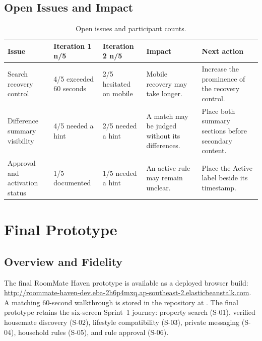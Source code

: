 \documentclass[11pt,a4paper]{article}
\begin{document}
\subsection{Open Issues and Impact}
\label{subsecpersistentissues}

\begin{table}[H]
    \centering
    \footnotesize
    \caption{Open issues and participant counts.}
    \begin{tabularx}{\textwidth}{@{}L{3.0cm}L{1.8cm}L{1.8cm}YL{3.1cm}@{}}
        \toprule
        Issue & Iteration 1 n/5 & Iteration 2 n/5 & Impact & Next action\\
        \midrule

        Search recovery control &
        4/5 exceeded 60 seconds &
        2/5 hesitated on mobile &
        Mobile recovery may take longer. &
        Increase the prominence of the recovery control.\\

        Difference summary visibility &
        4/5 needed a hint &
        2/5 needed a hint &
        A match may be judged without its differences. &
        Place both summary sections before secondary content.\\

        Approval and activation status &
        1/5 documented &
        1/5 needed a hint &
        An active rule may remain unclear. &
        Place the Active label beside its timestamp.\\

        \bottomrule
    \end{tabularx}
\end{table}

\section{Final Prototype}
\label{secfinalprototype}

\subsection{Overview and Fidelity}
\label{subsecfinalprototypeoverview}

The final RoomMate Haven prototype is available as a deployed browser build:
\url{http://roommate-haven-dev.eba-2h6p4mxq.ap-southeast-2.elasticbeanstalk.com}.
A matching 60-second walkthrough is stored in the
repository at . The final
prototype retains the six-screen Sprint~1 journey: property search (S-01),
verified housemate discovery (S-02), lifestyle compatibility (S-03), private
messaging (S-04), household rules (S-05), and rule approval (S-06).
\end{document}
